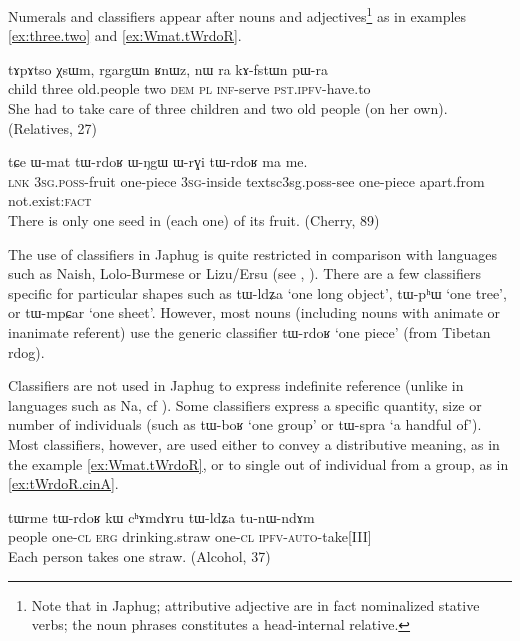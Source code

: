 \documentclass[oldfontcommands,oneside,a4paper,12pt]{article}
\newcommand{\ipa}[1]{{\phon#1}}
\begin{document}
Numerals and classifiers appear after nouns and adjectives\footnote{Note that in Japhug; attributive adjective are in fact nominalized stative verbs; the noun phrases constitutes a head-internal relative.} as in examples \ref{ex:three.two} and  \ref{ex:Wmat.tWrdoR}.

\begin{exe}
\ex \label{ex:three.two}
\gll 
 \ipa{tɤpɤtso} 	\ipa{χsɯm,} 	\ipa{rgargɯn} 	\ipa{ʁnɯz,} 	\ipa{nɯ} \ipa{ra} 	\ipa{kɤ-fstɯn} 	\ipa{pɯ-ra} \\
 child three old.people two \textsc{dem} \textsc{pl} \textsc{inf}-serve \textsc{pst.ipfv}-have.to \\
\glt She had to take care of three children and two old people (on her own). (Relatives, 27)
\end{exe}

\begin{exe}
\ex \label{ex:Wmat.tWrdoR}
\gll 
\ipa{tɕe} 	\ipa{ɯ-mat} 	\ipa{tɯ-rdoʁ} 	\ipa{ɯ-ŋgɯ} 	\ipa{ɯ-rɣi} 	\ipa{tɯ-rdoʁ} 	\ipa{ma} 	\ipa{me.} \\
\textsc{lnk} \textsc{3sg.poss}-fruit  one-piece \textsc{3sg}-inside textsc{3sg.poss}-see  one-piece apart.from not.exist:\textsc{fact} \\
\glt There is only one seed in (each one) of its fruit. (Cherry, 89)
\end{exe}

The use of classifiers in Japhug is quite restricted in comparison with languages such as Naish, Lolo-Burmese or Lizu/Ersu (see \citealt[216-224]{lidz10na}, \citealt{zhang14classifiers}). There are a few classifiers specific for particular shapes such as \ipa{tɯ-ldʑa} `one long object', \ipa{tɯ-pʰɯ} `one tree', or \ipa{tɯ-mpɕar} `one sheet'. However, most nouns (including nouns with animate or inanimate referent) use the generic classifier \ipa{tɯ-rdoʁ} `one piece' (from Tibetan \ipa{rdog}).  

Classifiers are not used in Japhug to express indefinite reference (unlike in languages such as Na, cf \citealt[206]{lidz10na}). Some classifiers express a specific quantity,  size or number of individuals (such as \ipa{tɯ-boʁ} `one group' or \ipa{tɯ-spra} `a handful of'). Most classifiers, however, are used either to convey a distributive meaning, as in the example \ref{ex:Wmat.tWrdoR}, or to single out of individual from a group, as in \ref{ex:tWrdoR.cinA}.
 
\begin{exe}
\ex \label{ex:Wmat.tWrdoR}
\gll 
\ipa{tɯrme} 	\ipa{tɯ-rdoʁ} 	\ipa{kɯ} 	\ipa{cʰɤmdɤru} 	\ipa{tɯ-ldʑa} 	\ipa{tu-nɯ-ndɤm} \\
people one-\textsc{cl} \textsc{erg} drinking.straw one-\textsc{cl} \textsc{ipfv-auto}-take[III] \\
\glt Each person takes one straw. (Alcohol, 37)
\end{exe}
 
\end{document}
